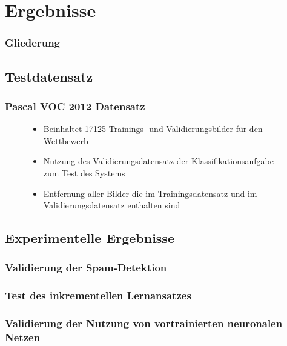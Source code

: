 \documentclass[utf8]{beamer}
\begin{document}
\section{Ergebnisse}

\begin{frame}
    \frametitle{Gliederung}
    \tableofcontents[currentsection]
\end{frame}

\subsection{Testdatensatz}

\begin{frame}
    \frametitle{Pascal VOC 2012 Datensatz}
    \begin{figure}
        \begin{itemize}
          \item Beinhaltet \num{17125} Trainings- und Validierungsbilder für den Wettbewerb
          \item Nutzung des Validierungsdatensatz der Klassifikationsaufgabe zum Test des Systems
          \item Entfernung aller Bilder die im Trainingsdatensatz und im Validierungsdatensatz enthalten sind
        \end{itemize}

    \end{figure}
\end{frame}


\subsection{Experimentelle Ergebnisse}

\begin{frame}
    \frametitle{Validierung der Spam-Detektion}
    \begin{figure}

    \end{figure}
\end{frame}

\begin{frame}
    \frametitle{Test des inkrementellen Lernansatzes}
    \begin{figure}

    \end{figure}
\end{frame}

\begin{frame}
    \frametitle{Validierung der Nutzung von vortrainierten neuronalen Netzen}
    \begin{figure}

    \end{figure}
\end{frame}
\end{document}
